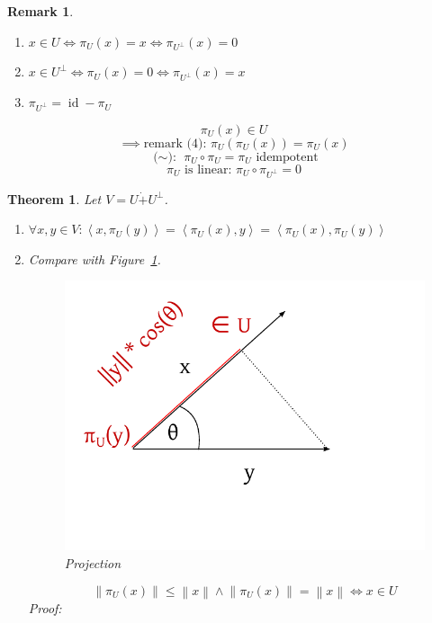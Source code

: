\documentclass{article}
\newcounter{lecref}[section]
\numberwithin{lecref}{section}
\newtheorem{theorem}[lecref]{Theorem}
\newtheorem{remark}[lecref]{Remark}
\newcommand{\ip}[2]{\left\langle#1,#2\right\rangle} %
\newcommand{\norm}[1]{\left\|#1\right\|}
\begin{document}
\begin{remark}
  \begin{enumerate}
    \item $x \in U \iff \pi_U(x) = x \iff \pi_{U^\bot}(x) = 0$
    \item $x \in U^\bot \iff \pi_U(x) = 0 \iff \pi_{U^\bot}(x) = x$
    \item $\pi_{U^\bot} = \operatorname{id} - \pi_U$
  \end{enumerate}
\end{remark}

\[ \pi_U(x) \in U \]
\[ \implies \text{remark (4): } \pi_U(\pi_U(x)) = \pi_U(x) \]
\[ \text{($\sim$): } \pi_U \circ \pi_U = \pi_U \text{ idempotent} \]
\[ \pi_U \text{ is linear: } \pi_U \circ \pi_{U^\bot} = 0 \]

\begin{theorem} %
  Let $V = U \dot+ U^{\bot}$.
  \begin{enumerate}
    \item $\forall x, y \in V: \ip{x}{\pi_{U}(y)} = \ip{\pi_U(x)}{y} = \ip{\pi_U(x)}{\pi_U(y)}$
    \item Compare with Figure~\ref{img:proj}.
      \begin{figure}[!ht]
        \begin{center}
          \includegraphics{img/10_projection.pdf}
          \caption{Projection}
          \label{img:proj}
        \end{center}
      \end{figure}
        \[ \norm{\pi_U(x)} \leq \norm{x} \land \norm{\pi_U(x)} = \norm{x} \iff x \in U \]
        Proof:
        \begin{enumerate}

\end{enumerate}
\end{enumerate}
\end{theorem}
\end{document}
